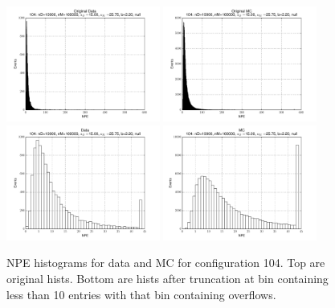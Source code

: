  \begin{figure}[htbp] \begin{center} 
\includegraphics[width=0.45\textwidth]{../FIGURES/104/FIG_Original_Data.pdf} 
\includegraphics[width=0.45\textwidth]{../FIGURES/104/FIG_Original_MC.pdf} 
\includegraphics[width=0.45\textwidth]{../FIGURES/104/FIG_Data.pdf} 
\includegraphics[width=0.45\textwidth]{../FIGURES/104/FIG_MC.pdf} 
\caption{NPE histograms for data and MC for configuration 104. Top are original hists. Bottom are hists after truncation at bin containing less than 10 entries with that bin containing overflows.} 
\label{tab:npe_104} 
\end{center} \end{figure} 
\clearpage
 
